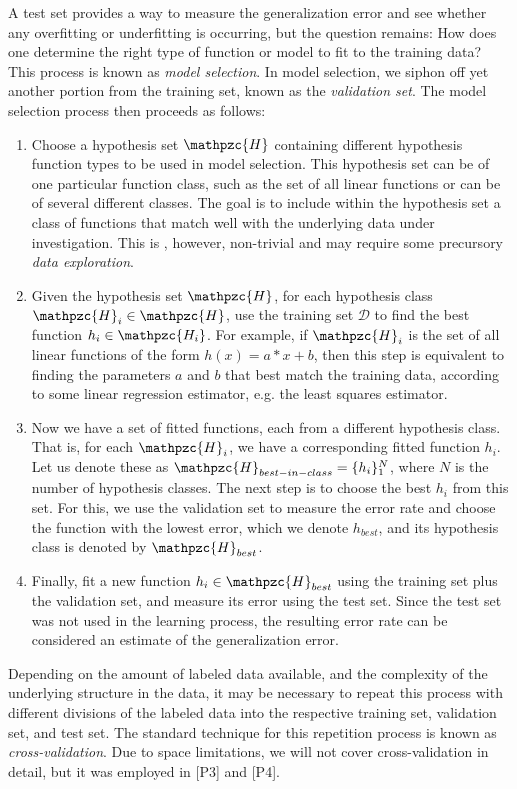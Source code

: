 A test set provides a way to measure the generalization error and see whether any overfitting or underfitting is occurring, but the question remains: How does one determine the right type of function or model to fit to the training data? This process is known as \emph{model selection}. In model selection, we siphon off yet another portion from the training set, known as the \emph{validation set}. The model selection process then proceeds as follows:
%
\begin{enumerate}
\item Choose a hypothesis set $\mathpzc{H}$ containing different hypothesis function types to be used in model selection. This hypothesis set can be of one particular function class, such as the set of all linear functions or can be of several different classes. The goal is to include within the hypothesis set a class of functions that match well with the underlying data under investigation. This is , however, non-trivial and may require some precursory \emph{data exploration}.
%
\item Given the hypothesis set $\mathpzc{H}$, for each hypothesis class $\mathpzc{H}_i \in \mathpzc{H}$, use the training set $\mathcal{D}$ to find the best function $h_i \in \mathpzc{H_i}$.  For example, if $\mathpzc{H}_i$ is the set of all linear functions of the form $h(x) = a * x + b$, then this step is equivalent to finding the parameters $a$ and $b$ that best match the training data, according to some linear regression estimator, e.g. the least squares estimator.
%
\item Now we have a set of fitted functions, each from a different hypothesis class. That is, for each $\mathpzc{H}_i$, we have a corresponding fitted function $h_i$. Let us denote these as $\mathpzc{H}_{best-in-class} = \{h_i\}_1^N$, where $N$ is the number of hypothesis classes. The next step is to choose the best $h_i$ from this set. For this, we use the validation set to measure the error rate and choose the function with the lowest error, which we denote $h_{best}$, and its hypothesis class is denoted by $\mathpzc{H}_{best}$.

\item Finally, fit a new function $h_i \in \mathpzc{H}_{best}$ using the training set plus the validation set, and measure its  error using the test set. Since the test set was not used in the learning process, the resulting error rate can be considered an estimate of the generalization error.
\end{enumerate}
%
Depending on the amount of labeled data available, and the complexity of the underlying structure in the data, it may be necessary to repeat this process with different divisions of the labeled data into the respective training set, validation set, and test set. The standard technique for this repetition process is known as \emph{cross-validation}. Due to space limitations, we will not cover cross-validation in detail, but it was employed in [P3] and [P4].%

